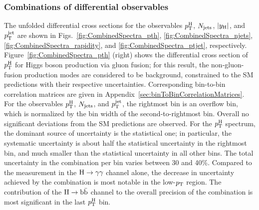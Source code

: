 \subsubsection{Combinations of differential observables}


The unfolded differential cross sections for the observables $p_\mathrm{T}^\mathrm{H}$, $N_\text{jets} $, $\left|y_\mathrm{H}\right| $, and $p_\mathrm{T}^\text{jet} $ are shown in
Figs.~\ref{fig:CombinedSpectra_pth}, \ref{fig:CombinedSpectra_njets}, \ref{fig:CombinedSpectra_rapidity}, and \ref{fig:CombinedSpectra_ptjet}, respectively.
% 
Figure~\ref{fig:CombinedSpectra_pth} (right) shows the differential cross section of $p_\mathrm{T}^\mathrm{H}$ for Higgs boson production via gluon fusion;
% 
for this result, the non-gluon-fusion production modes are considered to be background, constrained to the SM predictions with their respective uncertainties.
% 
% 
% 
% 
Corresponding bin-to-bin correlation matrices are given in Appendix~\ref{sec:binToBinCorrelationMatrices}.
% 
For the observables $p_\mathrm{T}^\mathrm{H}$, $N_\text{jets} $, and $p_\mathrm{T}^\text{jet} $, the rightmost bin is an overflow bin, which is normalized by the bin width of the second-to-rightmost bin.
% 
% 
% 
Overall no significant deviations from the SM predictions are observed.
% 
For the $p_\mathrm{T}^\mathrm{H}$ spectrum, the dominant source of uncertainty is the statistical one; in particular, the systematic uncertainty is about half the statistical uncertainty in the rightmost bin, and much smaller than the statistical uncertainty in all other bins.
% 
% 
The total uncertainty in the combination per bin varies between 30 and 40\%.
% 
Compared to the measurement in the $\mathrm{H}\to\mathrm{\gamma}\mathrm{\gamma}$ channel alone,
the decrease in uncertainty achieved by the combination is most notable in the low-$p_\mathrm{T}$ region.
% 
% 
The contribution of the $\mathrm{H}\to\mathrm{b}\bar{\mathrm{b}}$ channel to the overall precision of the combination is most significant in the last $p_\mathrm{T}^\mathrm{H}$ bin.

